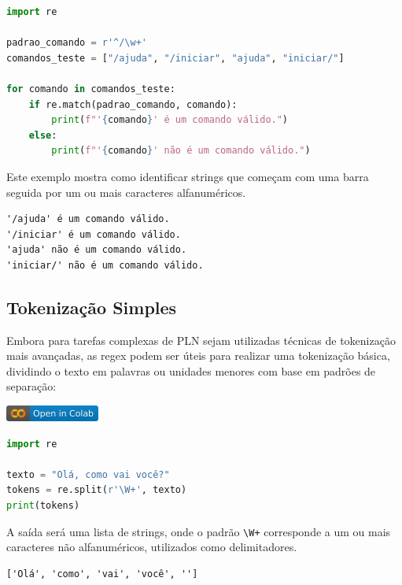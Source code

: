 \documentclass[14pt,a4paper,oneside]{book}
\begin{document}
\begin{lstlisting}[language=Python, caption=Análise de comandos com regex, label=lst:analise_comando]
import re

padrao_comando = r'^/\w+'
comandos_teste = ["/ajuda", "/iniciar", "ajuda", "iniciar/"]

for comando in comandos_teste:
    if re.match(padrao_comando, comando):
        print(f"'{comando}' é um comando válido.")
    else:
        print(f"'{comando}' não é um comando válido.")
\end{lstlisting}
Este exemplo mostra como identificar strings que começam com uma barra seguida por um ou mais caracteres alfanuméricos.

\begin{lstlisting}
'/ajuda' é um comando válido.
'/iniciar' é um comando válido.
'ajuda' não é um comando válido.
'iniciar/' não é um comando válido.
\end{lstlisting}

\subsection{Tokenização Simples}

Embora para tarefas complexas de PLN sejam utilizadas técnicas de tokenização mais avançadas, as regex podem ser úteis para realizar uma tokenização básica, dividindo o texto em palavras ou unidades menores com base em padrões de separação:

\vspace{\baselineskip}
\href{https://colab.research.google.com/github/giseldo/chatbotbook/blob/main/notebook/cap11_4.ipynb}{
  \includegraphics{./fig/colab-badge.png}
}

\begin{lstlisting}[language=Python, caption=Tokenização simples com regex, label=lst:tokenizacao_simples]
import re

texto = "Olá, como vai você?"
tokens = re.split(r'\W+', texto)
print(tokens)
\end{lstlisting}

A saída será uma lista de strings, onde o padrão \texttt{\textbackslash{}W+} corresponde a um ou mais caracteres não alfanuméricos, utilizados como delimitadores.

\begin{lstlisting}
['Olá', 'como', 'vai', 'você', '']
\end{lstlisting}
\end{document}
